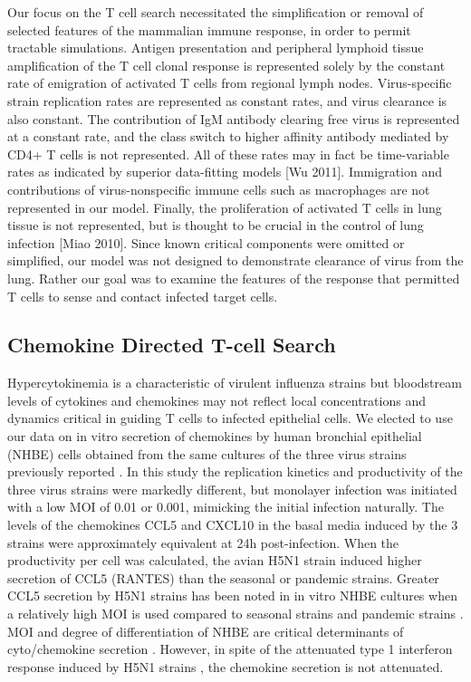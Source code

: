 \documentclass[10pt]{article}
\begin{document}
Our focus on the T cell search necessitated the simplification or removal of selected features of the mammalian immune response, in order to permit tractable simulations.  Antigen presentation and peripheral lymphoid tissue amplification of the T cell clonal response is represented solely by the constant rate of emigration of activated T cells from regional lymph nodes.  Virus-specific strain replication rates are represented as constant rates, and virus clearance is also constant.  The contribution of IgM antibody clearing free virus is represented at a constant rate, and the class switch to higher affinity antibody mediated by CD4+ T cells is not represented.  All of these rates may in fact be time-variable rates as indicated by superior data-fitting models [Wu 2011].  Immigration and contributions of virus-nonspecific immune cells such as macrophages are not represented in our model.  Finally, the proliferation of activated T cells in lung tissue is not represented, but is thought to be crucial in the control of lung infection [Miao 2010].  Since known critical components were omitted or simplified, our model was not designed to demonstrate clearance of virus from the lung.  Rather our goal was to examine the features of the response that permitted T cells to sense and contact infected target cells.


\subsection*{Chemokine Directed T-cell Search}

Hypercytokinemia is a characteristic of virulent influenza strains \cite{DeJong2006} but bloodstream levels of cytokines and chemokines may not reflect local concentrations and dynamics critical in guiding T cells to infected epithelial cells.  We elected to use our data on in vitro secretion of chemokines by human bronchial epithelial (NHBE) cells obtained from the same cultures of the three virus strains previously reported \cite{Mitchell2011}.  In this study the replication kinetics and productivity of the three virus strains were markedly different, but monolayer infection was initiated with a low MOI of 0.01 or 0.001, mimicking the initial infection naturally.  The levels of the chemokines CCL5 and CXCL10 in the basal media induced by the 3 strains were approximately equivalent at 24h post-infection.  When the productivity per cell was calculated, the avian H5N1 strain induced higher secretion of CCL5 (RANTES) than the seasonal or pandemic strains.  Greater CCL5 secretion by H5N1 strains has been noted in in vitro NHBE cultures when a relatively high MOI is used compared to seasonal strains \cite{Chan2005, Chan2010, Zeng2011} and pandemic strains \cite{Zeng2011}.  MOI and degree of differentiation of NHBE are critical determinants of cyto/chemokine secretion \cite{Chan2010}.  However, in spite of the attenuated type 1 interferon response induced by H5N1 strains \cite{Zeng2007}, the chemokine secretion is not attenuated.
\end{document}
